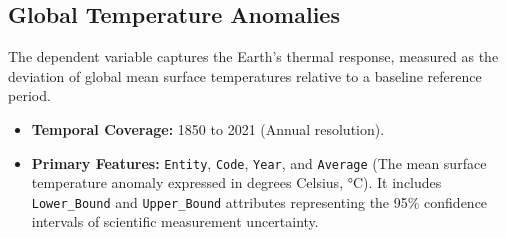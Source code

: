 \documentclass[11pt,letterpaper]{article}
\begin{document}
\subsection{Global Temperature Anomalies}
The dependent variable captures the Earth's thermal response, measured as the deviation of global mean surface temperatures relative to a baseline reference period.
\begin{itemize}
	\item \textbf{Temporal Coverage:} 1850 to 2021 (Annual resolution).
	\item \textbf{Primary Features:} \texttt{Entity}, \texttt{Code}, \texttt{Year}, and \texttt{Average} (The mean surface temperature anomaly expressed in degrees Celsius, °C). It includes \texttt{Lower\_Bound} and \texttt{Upper\_Bound} attributes representing the 95\% confidence intervals of scientific measurement uncertainty.
\end{itemize}
\end{document}
